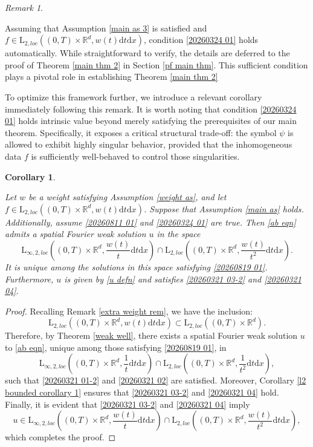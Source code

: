 \documentclass[11pt,reqno]{amsart}
\newtheorem{corollary}[thm]{Corollary}
\theoremstyle{definition}
\theoremstyle{remark}
\newtheorem{rem}[thm]{Remark}
\newcommand\bR{\mathbb{R}}
\numberwithin{equation}{section}
\begin{document}
\begin{rem}
										\label{20260401 rmk 1}


Assuming that Assumption \ref{main as 3} is satisfied and $f \in \mathrm{L}_{2,loc}\left( (0,T) \times \bR^d, w(t)\mathrm{d}t\mathrm{d}x \right)$, condition \eqref{20260324 01} holds automatically. 
While straightforward to verify, the details are deferred to the proof of Theorem \ref{main thm 2} in Section \ref{pf main thm}. 
This sufficient condition plays a pivotal role in establishing Theorem \ref{main thm 2}





To optimize this framework further, we introduce a relevant corollary immediately following this remark.
It is worth noting that condition \eqref{20260324 01} holds intrinsic value beyond merely satisfying the prerequisites of our main theorem. 
Specifically, it exposes a critical structural trade-off: the symbol $\psi$ is allowed to exhibit highly singular behavior, provided that the inhomogeneous data $f$ is sufficiently well-behaved to control those singularities.
\end{rem}

\begin{corollary}
									\label{weak well weight}

Let $w$ be a weight satisfying Assumption \ref{weight as}, and let $f \in \mathrm{L}_{2,loc}\left( (0,T) \times \bR^d, w(t)\mathrm{d}t\mathrm{d}x \right)$. 
Suppose that Assumption \ref{main as} holds. 
Additionally, assume \eqref{20260811 01} and \eqref{20260324 01} are true.
Then \eqref{ab eqn} admits a spatial Fourier weak solution $u$ in the space
$$
\mathrm{L}_{\infty,2, loc}\left( (0,T) \times \bR^d, \frac{w(t)}{t} \mathrm{d}t \mathrm{d}x \right) \cap \mathrm{L}_{2, loc}\left( (0,T) \times \bR^d, \frac{w(t)}{t^2}\mathrm{d}t \mathrm{d}x \right).
$$
It is unique among the solutions in this space satisfying
\eqref{20260819 01}. Furthermore, $u$ is given by \eqref{u defn} and
satisfies \eqref{20260321 03-2} and \eqref{20260321 04}.
\end{corollary}
\begin{proof}
Recalling Remark \ref{extra weight rem}, we have the inclusion:
$$
\mathrm{L}_{2,loc}\left( (0,T) \times \bR^d, w(t)\mathrm{d}t\mathrm{d}x \right) \subset \mathrm{L}_{2,loc}\left( (0,T) \times \bR^d \right).
$$
Therefore, by Theorem \ref{weak well}, there exists a spatial Fourier weak solution $u$ to \eqref{ab eqn}, unique among those satisfying \eqref{20260819 01}, in
$$
\mathrm{L}_{\infty,2, loc}\left( (0,T) \times \bR^d, \frac{1}{t}\mathrm{d}t \mathrm{d}x \right) \cap \mathrm{L}_{2,loc}\left( (0,T) \times \bR^d, \frac{1}{t^2}\mathrm{d}t\mathrm{d}x \right),$$
such that \eqref{20260321 01-2} and \eqref{20260321 02} are satisfied. 
Moreover, Corollary \ref{l2 bounded corollary 1} ensures that \eqref{20260321 03-2} and \eqref{20260321 04} hold. 
Finally, it is evident that \eqref{20260321 03-2} and \eqref{20260321 04} imply
$$
u \in \mathrm{L}_{\infty,2, loc}\left( (0,T) \times \bR^d, \frac{w(t)}{t} \mathrm{d}t \mathrm{d}x \right) \cap \mathrm{L}_{2, loc}\left( (0,T) \times \bR^d, \frac{w(t)}{t^2}\mathrm{d}t \mathrm{d}x \right),
$$
which completes the proof.
\end{proof}
\end{document}
